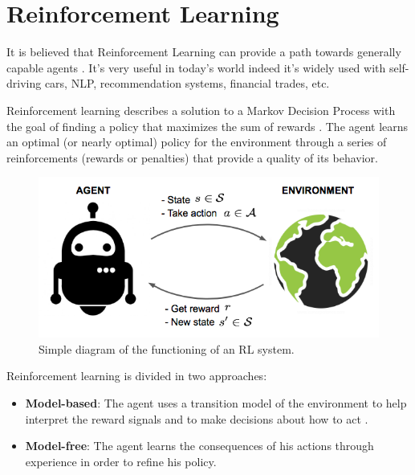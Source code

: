 \section{Reinforcement Learning}
It is believed that Reinforcement Learning can provide a path towards generally capable agents \cite{silver2021reward} \cite{parker2022automated}.
It's very useful in today's world indeed it's widely used with self-driving cars, NLP, recommendation systems, financial trades, etc.

Reinforcement learning \cite{sutton2018reinforcement} describes a solution to a Markov Decision Process
with the goal of finding a policy that maximizes the sum of rewards \cite{huys2014reward}.
%
The agent learns an optimal (or nearly optimal) policy for the environment \cite{russell2002artificial}
through a series of reinforcements (rewards or penalties) that provide a quality of its behavior.

\begin{figure}[ht]
    \centering
    \includegraphics[scale=0.4]{images/RL_illustration.png}
    \caption{Simple diagram of the functioning of an RL system.}
    \label{fig:RL_illustration}
\end{figure}

\noindent
Reinforcement learning is divided in two approaches:
\begin{itemize}
    \item \textbf{Model-based}:
          The agent uses a transition model of the environment to help interpret the reward signals and to make decisions about how to act \cite{russell2021artificial}.
    \item \textbf{Model-free}:
          The agent learns the consequences of his actions through experience in order to refine his policy.
\end{itemize}

